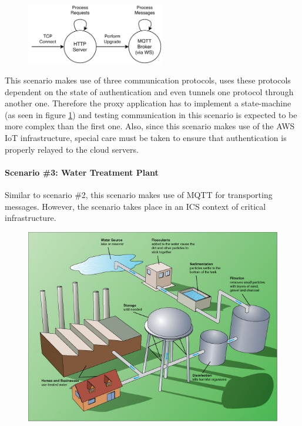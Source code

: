 \begin{figure}[ht]
    \centering
    \includegraphics[width=6cm]{img/ch04/Statemachine 2.pdf}
    \label{fig:aws-statemachine}
\end{figure}
This scenario makes use of three communication protocols, uses these protocols dependent on the state of authentication and even tunnels one protocol through another one. Therefore the proxy application has to implement a state-machine (as seen in figure \ref{fig:aws-statemachine}) and testing communication in this scenario is expected to be more complex than the first one. Also, since this scenario makes use of the \ac{AWS} \ac{IoT} infrastructure, special care must be taken to ensure that authentication is properly relayed to the cloud servers.


\paragraph{Scenario \#3: Water Treatment Plant} Similar to scenario \#2, this scenario makes use of \ac{MQTT} for transporting messages. However, the scenario takes place in an \ac{ICS} context of critical infrastructure.

\begin{figure}[hb]
    \centering
    \includegraphics[width=12cm]{img/ch04/watertreatmentplant.png}
    \label{fig:water-treatment}
\end{figure}

